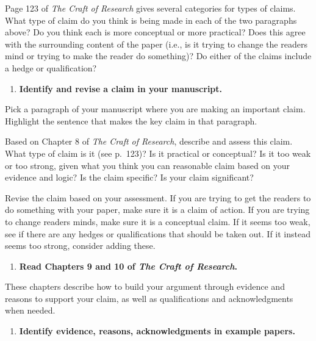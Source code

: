 \documentclass[]{tufte-book}
\providecommand{\tightlist}{%
  \setlength{\itemsep}{0pt}\setlength{\parskip}{0pt}}
\begin{document}
Page 123 of \emph{The Craft of Research} gives several categories for types of
claims. What type of claim do you think is being made in each of the two
paragraphs above? Do you think each is more conceptual or more practical?
Does this agree with the surrounding content of the paper (i.e., is it trying
to change the readers mind or trying to make the reader do something)?
Do either of the claims include a hedge or qualification?

\begin{enumerate}
\def\labelenumi{\arabic{enumi}.}
\setcounter{enumi}{2}
\tightlist
\item
  \textbf{Identify and revise a claim in your manuscript.}
\end{enumerate}

Pick a paragraph of your manuscript where you are making an important claim.
Highlight the sentence that makes the key claim in that paragraph.

Based on Chapter 8 of \emph{The Craft of Research}, describe and assess this claim.
What type of claim is it (see p.~123)? Is it practical or conceptual? Is it
too weak or too strong, given what you think you can reasonable claim based on
your evidence and logic? Is the claim specific? Is your claim significant?

Revise the claim based on your assessment. If you are trying to get the readers
to do something with your paper, make sure it is a claim of action. If you
are trying to change readers minds, make sure it is a conceptual claim. If it
seems too weak, see if there are any hedges or qualifications that should be
taken out. If it instead seems too strong, consider adding these.

\begin{enumerate}
\def\labelenumi{\arabic{enumi}.}
\setcounter{enumi}{3}
\tightlist
\item
  \textbf{Read Chapters 9 and 10 of \emph{The Craft of Research}.}
\end{enumerate}

These chapters describe how to build your argument through evidence and reasons
to support your claim, as well as qualifications and acknowledgments when
needed.

\begin{enumerate}
\def\labelenumi{\arabic{enumi}.}
\setcounter{enumi}{4}
\tightlist
\item
  \textbf{Identify evidence, reasons, acknowledgments in example papers.}
\end{enumerate}
\end{document}
